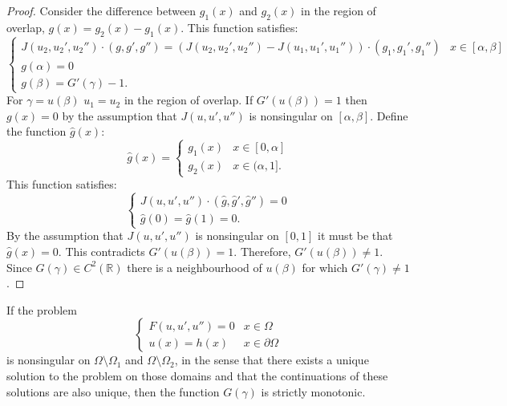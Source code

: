 \documentclass{book}
\begin{document}
\begin{proof}
Consider the difference between $g_1(x)$ and $g_2(x)$ in the region of overlap, $g(x) = g_2(x) - g_1(x)$.
This function satisfies:
\begin{equation*}
\begin{cases} J(u_2,u_2',u_2'') \cdot (g, g', g'') = \left ( J(u_2, u_2', u_2'') - J(u_1, u_1', u_1'') \right ) \cdot (g_1, g_1', g_1'') & x \in [\alpha, \beta] \\ g(\alpha) = 0 \\ g(\beta) = G'(\gamma) - 1. \end{cases}
\end{equation*}
For $\gamma = u(\beta)$ $u_1 = u_2$ in the region of overlap.
If $G'(u(\beta)) = 1$ then $g(x) = 0$ by the assumption that $J(u,u',u'')$ is nonsingular on $[\alpha,\beta]$.
Define the function $\hat{g}(x)$:
\begin{equation*}
\hat{g}(x) = \begin{cases} g_1(x) & x \in [0,\alpha] \\ g_2(x) & x \in (\alpha,1]. \end{cases}
\end{equation*}
This function satisfies:
\begin{equation*}
\begin{cases} J(u,u',u'') \cdot (\hat{g},\hat{g}',\hat{g}'') = 0 \\ \hat{g}(0) = \hat{g}(1) = 0. \end{cases}
\end{equation*}
By the assumption that $J(u,u',u'')$ is nonsingular on $[0,1]$ it must be that $\hat{g}(x) = 0$.
This contradicts $G'(u(\beta)) = 1$.
Therefore, $G'(u(\beta)) \neq 1$.
Since $G(\gamma) \in C^2(\mathbb{R})$ there is a neighbourhood of $u(\beta)$ for which $G'(\gamma) \neq 1$.
\end{proof}

\begin{thm}
If the problem
\begin{equation*}
\begin{cases} F(u,u',u'') = 0 & x \in \Omega \\ u(x) = h(x) & x \in \partial \Omega \end{cases}
\end{equation*}
is nonsingular on $\Omega \setminus \Omega_1$ and $\Omega \setminus \Omega_2$, in the sense that there exists a unique solution to the problem on those domains and that the continuations of these solutions are also unique, then the function $G(\gamma)$ is strictly monotonic.
\end{thm}
\end{document}
